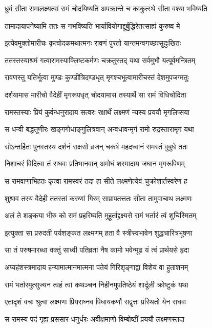\twolineshloka
{ध्रुवं सीता समालक्ष्यत्वां रामं चोदयिष्यति}
{अपक्रान्ते च काकुत्स्थे सीता वश्या भविष्यति}


\twolineshloka
{तामादायापनेष्यामि ततः स नभविष्यति}
{भार्यावियोगाद्दुर्बुद्धिरेतत्साह्यं कुरुष्व मे}


\twolineshloka
{इत्येवमुक्तोमारीचः कृत्वोदकमथात्मनः}
{रावणं पुरतो यान्तमन्वगच्छत्सुदुःखितः}


\twolineshloka
{ततस्तस्याश्रमं गत्वारामस्याक्लिष्टकर्मणः}
{चक्रतुस्तद् यथा सर्वमुभौ यत्पूर्वमन्त्रितम्}


\twolineshloka
{रावणस्तु यतिर्भूत्वा मुण्डः कुण्डीत्रिदण्डधृत्}
{मृगश्चभूत्वामारीचस्तं देशमुपजग्मतुः}


\twolineshloka
{दर्शयामास मारीचो वैदेहीं मृगरूपधृत्}
{चोदयामास तस्यार्थे सा रामं विधिचोदिता}


\twolineshloka
{रामस्तस्याः प्रियं कुर्वन्धनुरादाय सत्वरः}
{रक्षार्थे लक्ष्मणं न्यस्य प्रययौ मृगलिप्सया}


\twolineshloka
{स धन्वी बद्धतूणीरः खङ्गगोधाङ्गुलित्रवान्}
{अन्वधावन्मृगं रामो रुद्रस्तारामृगं यथा}


\twolineshloka
{सोऽन्तर्हितः पुनस्तस्य दर्शनं राक्षसो व्रजन्}
{चकर्ष महदध्वानं रामस्तं वुबुधे ततः}


\twolineshloka
{निशाचरं विदित्वा तं राघवः प्रतिभानवान्}
{अमोघं शरमादाय जघान मृगरूपिणम्}


\twolineshloka
{स रामवाणाभिहतः कृत्वा रामस्वरं तदा}
{हा सीते लक्ष्मणेत्येवं चुक्रोशार्तस्वरेण ह}


\twolineshloka
{शुश्राव तस्य वैदेही ततस्तां करुणां गिरम्}
{साप्रापतत्ततः सीता तामुवाचाथ लक्ष्मणः}


\twolineshloka
{अलं ते शङ्कया भीरु को रामं प्रहरिष्यति}
{मुहूर्ताद्द्रक्ष्यसे रामं भर्तारं त्वं शुचिस्मितम्}


\twolineshloka
{इत्युक्ता सा प्ररुदती पर्यशङ्कत लक्ष्मणम्}
{हता वै स्त्रीस्वभावेन शुद्धचारित्रभूषणा}


\twolineshloka
{सा तं परुषमारब्धा वक्तुं साध्वी पतिव्रता}
{नैष कामो भवेन्मूढ यं त्वं प्रार्थयसे हृदा}


\twolineshloka
{अप्यहंशस्त्रमादाय हन्यामात्मानमात्मना}
{पतेयं गिरिशृङ्गाद्वा विशेयं वा हुताशनम्}


\twolineshloka
{रामं भर्तारमुत्सुज्यन त्वहं त्वां कथञ्चन}
{निहीनमुपतिष्ठेयं शार्दूली क्रोष्टुकं यथा}


\twolineshloka
{एतादृशं वचः श्रुत्वा लक्ष्मणः प्रियराघ्नव}
{पिधायकर्णौ सद्वृत्तः प्रस्थितो येन राघवः}


\twolineshloka
{स रामस्य पदं गृह्य प्रससार धनुर्धरः}
{अवीक्षमाणो विम्बोष्ठीं प्रययौ लक्ष्मणस्तदा}


